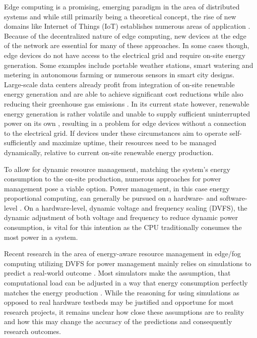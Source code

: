 Edge computing is a promising, emerging paradigm in the area of distributed
systems and while still primarily being a theoretical concept, the rise of new
domains like Internet of Things (IoT) establishes numerous areas of application
\cite{premsankar2018}. Because of the decentralized nature of edge computing,
new devices at the edge of the network are essential for many of these
approaches. In some cases though, edge devices do not have access to the
electrical grid and require on-site energy generation. Some examples include
portable weather stations, smart watering and metering in autonomous farming or
numerous sensors in smart city designs. Large-scale data centers already profit
from integration of on-site renewable energy generation and are able to achieve
significant cost reductions while also reducing their greenhouse gas emissions
\cite{tu2013}. In its current state however, renewable energy generation is
rather volatile and unable to supply sufficient uninterrupted power on its own
\cite{rostirolla2022}, resulting in a problem for edge devices without a
connection to the electrical grid. If devices under these circumstances aim to
operate self-sufficiently and maximize uptime, their resources need to be
managed dynamically, relative to current on-site renewable energy production.

To allow for dynamic resource management, matching the system's energy
consumption to the on-site production, numerous approaches for power management
pose a viable option. Power management, in this case energy proportional
computing, can generally be pursued on a hardware- and software-level
\cite{barroso2007}. On a hardware-level, dynamic voltage and frequency scaling
(DVFS), the dynamic adjustment of both voltage and frequency to reduce dynamic
power consumption, is vital for this intention as the \textsc{CPU} traditionally
consumes the most power in a system.

Recent research in the area of energy-aware resource management in edge/fog
computing utilizing DVFS for power management mainly relies on simulations to
predict a real-world outcome \cite{wiesner2022, karimiafshar2020, toor2019}.
Most simulators make the assumption, that computational load can be adjusted in
a way that energy consumption perfectly matches the energy production
\cite{leaf, cloudsim, ifogsim, chameleon}. While the reasoning for using
simulations as opposed to real hardware testbeds may be justified and opportune
for most research projects, it remains unclear how close these assumptions are
to reality and how this may change the accuracy of the predictions and
consequently research outcomes.

